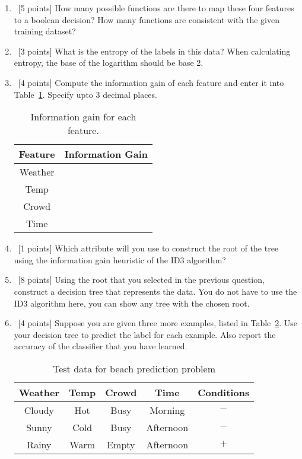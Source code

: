 \begin{enumerate}
  \begin{enumerate}
  \item~[5 points] How many possible functions are there to map these four features to a boolean decision? 
  How many functions are consistent with the given training dataset?
  \item~[3 points] What is the entropy of the labels in this data? 
  When calculating entropy, the base of the logarithm should be base 2.
  \item~[4 points] Compute the information gain of each feature and enter it into Table~\ref{tab:entropy-ig}. 
  Specify upto 3 decimal places.
  
    \begin{table}[h]
      \centering
      \begin{tabular}{c|c}

        \hline
        Feature & Information Gain \\ \hline
        Weather &                  \\
        Temp    &                  \\
        Crowd   &                  \\
        Time    &                  \\ \hline
      \end{tabular}
      \caption{Information gain for each feature.}
      \label{tab:entropy-ig}
    \end{table}
  
  \item~[1 points] Which attribute will you use to construct the root of the tree using the information gain heuristic of the ID3 algorithm?
  \item~[8 points] Using the root that you selected in the previous question, construct a decision tree that represents the data. 
  You do not have to use the ID3 algorithm here, you can show any tree with the chosen root.
  \item~[4 points] Suppose you are given three more examples, listed in Table~\ref{tab:decision-tree-test}. 
  Use your decision tree to predict the label for each example. 
  Also report the accuracy of the classifier that you have learned.
  
    \begin{table}[h!]
      \centering
      \begin{tabular}{cccc|c}
        \hline
        Weather & Temp & Crowd & Time      & Conditions \\ \hline
        Cloudy  & Hot  & Busy  & Morning   & $-$        \\
        Sunny   & Cold & Busy  & Afternoon & $-$        \\
        Rainy   & Warm & Empty & Afternoon & $+$        \\ \hline
      \end{tabular}
      \caption{Test data for beach prediction problem}
      \label{tab:decision-tree-test}
    \end{table}


\end{enumerate}
\end{enumerate}
